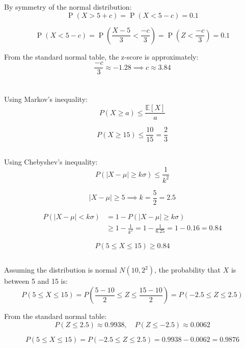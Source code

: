 \documentclass{homework}
\begin{document}
By symmetry of the normal distribution:
\[
\operatorname{P}(X > 5 + c) = \operatorname{P}(X < 5 - c) = 0.1
\]

\[
\operatorname{P}(X < 5 - c) = \operatorname{P}(\frac{X - 5}{3} < \frac{-c}{3}) = \operatorname{P}(Z < \frac{-c}{3}) = 0.1
\]

From the standard normal table, the z-score is approximately:
\[
\frac{-c}{3} \approx -1.28 \implies c \approx 3.84
\]

\section{}

\subsection{}

Using Markov's inequality:
\[
P(X \geq a) \leq \frac{\mathbb{E}[X]}{a}
\]

\[
P(X \geq 15) \leq \frac{10}{15} = \frac{2}{3}
\]

\subsection{}

Using Chebyshev's inequality:
\[
P(|X - \mu| \geq k\sigma) \leq \frac{1}{k^2}
\]

\[
|X - \mu| \geq 5 \implies k = \frac{5}{2} = 2.5
\]

\begin{align*}
    P(|X - \mu| < k\sigma) &= 1 - P(|X - \mu| \geq k\sigma) \\
    &\geq 1 - \frac{1}{k^2} = 1 - \frac{1}{6.25} = 1 - 0.16 = 0.84
\end{align*}


\[
P(5 \leq X \leq 15) \geq 0.84
\]

\subsection{}

Assuming the distribution is normal \( N(10, 2^2) \), the probability that \( X \) is between 5 and 15 is:
\[
P(5 \leq X \leq 15) = P\left(\frac{5 - 10}{2} \leq Z \leq \frac{15 - 10}{2}\right) = P(-2.5 \leq Z \leq 2.5)
\]

From the standard normal table:
\[
P(Z \leq 2.5) \approx 0.9938, \quad P(Z \leq -2.5) \approx 0.0062
\]

\[
P(5 \leq X \leq 15) = P(-2.5 \leq Z \leq 2.5) = 0.9938 - 0.0062 = 0.9876
\]
\end{document}
